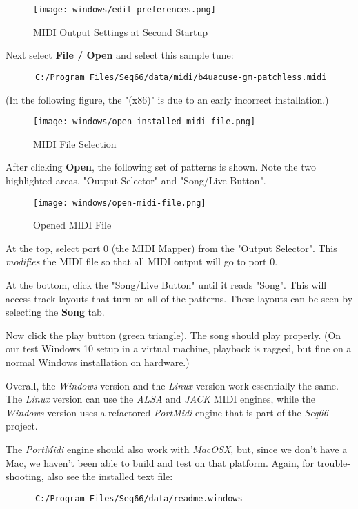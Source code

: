 \begin{figure}[H]
   \centering 
   \texttt{[image: windows/edit-preferences.png]}
   \caption{MIDI Output Settings at Second Startup}
   \label{fig:windows_output_settings_second_startup}
\end{figure}

   Next select \textbf{File / Open} and select this sample tune:

   \begin{verbatim}
      C:/Program Files/Seq66/data/midi/b4uacuse-gm-patchless.midi
   \end{verbatim}

   (In the following figure, the "(x86)" is due to an early incorrect
   installation.)

\begin{figure}[H]
   \centering 
   \texttt{[image: windows/open-installed-midi-file.png]}
   \caption{MIDI File Selection}
   \label{fig:windows_open_installed_midi_file}
\end{figure}

   After clicking \textbf{Open}, the following set of patterns is shown.
   Note the two highlighted areas, "Output Selector" and "Song/Live Button".

\begin{figure}[H]
   \centering 
   \texttt{[image: windows/open-midi-file.png]}
   \caption{Opened MIDI File}
   \label{fig:windows_open_midi_file}
\end{figure}

   At the top, select port 0 (the MIDI Mapper) from the "Output Selector".
   This \textsl{modifies} the MIDI file so that all MIDI
   output will go to port 0.

   At the bottom, click the "Song/Live Button" until it reads "Song".
   This will access track layouts that turn on all of the patterns.
   These layouts can be seen by selecting the \textbf{Song} tab.

   Now click the play button (green triangle).
   The song should play properly.
   (On our test Windows 10 setup in a virtual machine, playback is ragged,
   but fine on a normal Windows installation on hardware.)

   Overall, the \textsl{Windows} version and the \textsl{Linux} version
   work essentially the same. The \textsl{Linux} version can use the
   \textsl{ALSA} and \textsl{JACK} MIDI engines, while the \textsl{Windows}
   version uses a refactored \textsl{PortMidi} engine that is part of the
   \textsl{Seq66} project.

   The \textsl{PortMidi} engine should also work with \textsl{MacOSX}, but,
   since we don't have a Mac, we haven't been able to build and test
   on that platform.
   Again, for trouble-shooting, also see the installed text file:

   \begin{verbatim}
      C:/Program Files/Seq66/data/readme.windows
   \end{verbatim}

